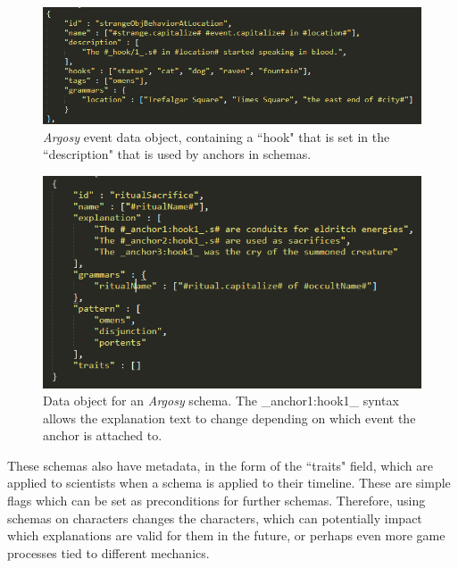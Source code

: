 
\begin{figure}
    \centering
    \includegraphics[width=\textwidth]{figures/4-Delve/argosy-event-data-object.png}
    \caption{\textit{Argosy} event data object, containing a ``hook" that is set in the ``description" that is used by anchors in schemas.}
    \label{fig:argosy-event-data}
\end{figure}



\begin{figure}
    \centering
    \includegraphics[width=\textwidth]{figures/4-Delve/argosy-schema.png}
    \caption{Data object for an \textit{Argosy} schema. The \_anchor1:hook1\_ syntax allows the explanation text to change depending on which event the anchor is attached to.}
    \label{fig:argosy-data-schema}
\end{figure}


These schemas also have metadata, in the form of the ``traits" field, which are applied to scientists when a schema is applied to their timeline. These are simple flags which can be set as preconditions for further schemas. Therefore, using schemas on characters changes the characters, which can potentially impact which explanations are valid for them in the future, or perhaps even more game processes tied to different mechanics.

